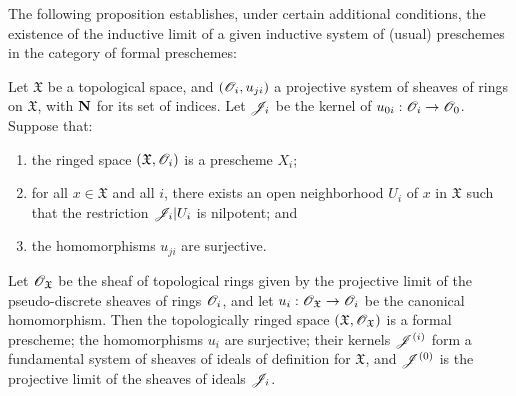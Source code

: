 The following proposition establishes, under certain additional conditions, the existence of the inductive limit of a given inductive system of (usual) preschemes in the category of formal preschemes:
\begin{proposition}[10.6.3]
\label{1.10.6.3}
Let $\mathfrak{X}$ be a topological space, and $(\mathscr{O}_i,u_{ji})$ a projective system of sheaves of rings on $\mathfrak{X}$, with $\mathbf{N}$ for its set of indices.
Let $\mathscr{J}_i$ be the kernel of $u_{0i}:\sh{O}_i\to\sh{O}_0$.
Suppose that:
\begin{enumerate}[label=\emph{(\alph*)}]
  \item the ringed space $(\mathfrak{X},\mathscr{O}_i)$ is a prescheme $X_i$;
  \item for all $x\in\mathfrak{X}$ and all $i$, there exists an open neighborhood $U_i$ of $x$ in $\mathfrak{X}$ such that the restriction $\mathscr{J}_i|U_i$ is nilpotent; and
  \item the homomorphisms $u_{ji}$ are surjective.
\end{enumerate}

Let $\mathscr{O}_\mathfrak{X}$ be the sheaf of topological rings given by the projective limit of the pseudo-discrete sheaves of rings $\mathscr{O}_i$, and let $u_i:\sh{O}_\mathfrak{X}\to\sh{O}_i$ be the canonical homomorphism.
Then the topologically ringed space $(\mathfrak{X},\mathscr{O}_\mathfrak{X})$ is a formal prescheme; the homomorphisms $u_i$ are surjective; their kernels $\mathscr{J}^{(i)}$ form a fundamental system of sheaves of ideals of definition for $\mathfrak{X}$, and $\mathscr{J}^{(0)}$ is the projective limit of the sheaves of ideals $\mathscr{J}_i$.
\end{proposition}

